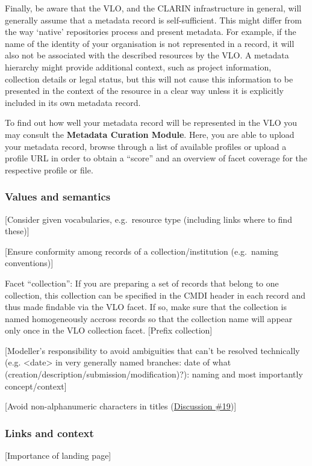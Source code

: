 \documentclass[]{article}
\begin{document}
Finally, be aware that the VLO, and the CLARIN infrastructure in
general, will generally assume that a metadata record is
self-sufficient. This might differ from the way `native' repositories
process and present metadata. For example, if the name of the identity
of your organisation is not represented in a record, it will also not be
associated with the described resources by the VLO. A metadata hierarchy
might provide additional context, such as project information,
collection details or legal status, but this will not cause this
information to be presented in the context of the resource in a clear
way unless it is explicitly included in its own metadata record.

To find out how well your metadata record will be represented in the VLO
you may consult the \textbf{Metadata Curation Module}. Here, you are
able to upload your metadata record, browse through a list of available
profiles or upload a profile URL in order to obtain a ``score'' and an
overview of facet coverage for the respective profile or file.

\subsubsection{Values and semantics}\label{values-and-semantics}

{[}Consider given vocabularies, e.g.~resource type (including links
where to find these){]}

{[}Ensure conformity among records of a collection/institution
(e.g.~naming conventions){]}

Facet ``collection'': If you are preparing a set of records that belong
to one collection, this collection can be specified in the CMDI header
in each record and thus made findable via the VLO facet. If so, make
sure that the collection is named homogeneously accross records so that
the collection name will appear only once in the VLO collection facet.
{[}Prefix collection{]}

{[}Modeller's responsibility to avoid ambiguities that can't be resolved
technically (e.g. \textless{}date\textgreater{} in very generally named
branches: date of what (creation/description/submission/modification)?):
naming and most importantly concept/context{]}

{[}Avoid non-alphanumeric characters in titles
(\href{https://www.gitbook.com/book/cmdi-taskforce/cmdi-best-practices/discussions/19}{Discussion
\#19}){]}

\subsubsection{Links and context}\label{links-and-context}

{[}Importance of landing page{]}
\end{document}
